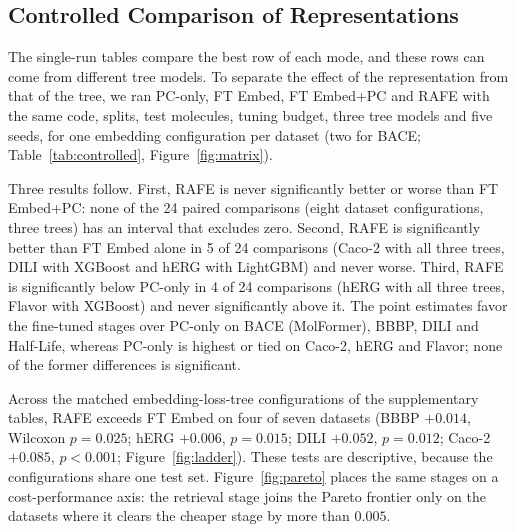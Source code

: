 \documentclass[pdflatex,sn-mathphys-num,Numbered]{sn-jnl}%
\begin{document}
\FloatBarrier
\subsection{Controlled Comparison of Representations}\label{sec:controlled}
The single-run tables compare the best row of each mode, and these rows can come from different tree models. To separate the effect of the representation from that of the tree, we ran PC-only, FT Embed, FT Embed+PC and RAFE with the same code, splits, test molecules, tuning budget, three tree models and five seeds, for one embedding configuration per dataset (two for BACE; Table~\ref{tab:controlled}, Figure~\ref{fig:matrix}).

Three results follow. First, RAFE is never significantly better or worse than FT Embed+PC: none of the 24 paired comparisons (eight dataset configurations, three trees) has an interval that excludes zero. Second, RAFE is significantly better than FT Embed alone in 5 of 24 comparisons (Caco-2 with all three trees, DILI with XGBoost and hERG with LightGBM) and never worse. Third, RAFE is significantly below PC-only in 4 of 24 comparisons (hERG with all three trees, Flavor with XGBoost) and never significantly above it. The point estimates favor the fine-tuned stages over PC-only on BACE (MolFormer), BBBP, DILI and Half-Life, whereas PC-only is highest or tied on Caco-2, hERG and Flavor; none of the former differences is significant.

Across the matched embedding-loss-tree configurations of the supplementary tables, RAFE exceeds FT Embed on four of seven datasets (BBBP $+0.014$, Wilcoxon $p=0.025$; hERG $+0.006$, $p=0.015$; DILI $+0.052$, $p=0.012$; Caco-2 $+0.085$, $p<0.001$; Figure~\ref{fig:ladder}). These tests are descriptive, because the configurations share one test set. Figure~\ref{fig:pareto} places the same stages on a cost-performance axis: the retrieval stage joins the Pareto frontier only on the datasets where it clears the cheaper stage by more than $0.005$.

\begin{table}[!ht]
\centering
\caption{Controlled comparison: mean test metric over five seeds for each representation, tree model and dataset (one embedding configuration per dataset; MCC for classification, Spearman for regression). Every row uses identical splits, test molecules and tuning budget.}
\label{tab:controlled}
\footnotesize

\end{table}
\end{document}
